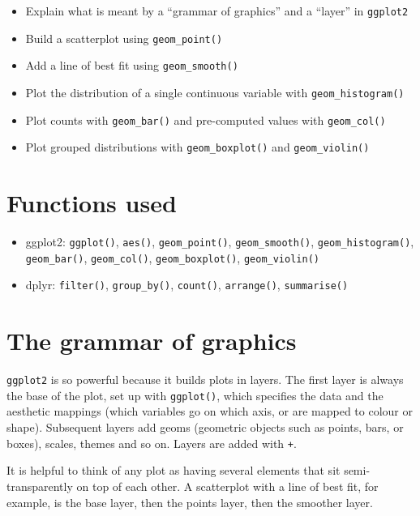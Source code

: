 \documentclass[
  english,
  letterpaper,
]{book}
\providecommand{\tightlist}{%
  \setlength{\itemsep}{0pt}\setlength{\parskip}{0pt}}
\begin{document}
\begin{itemize}
\tightlist
\item
  Explain what is meant by a ``grammar of graphics'' and a ``layer'' in
  \texttt{ggplot2}
\item
  Build a scatterplot using \texttt{geom\_point()}
\item
  Add a line of best fit using \texttt{geom\_smooth()}
\item
  Plot the distribution of a single continuous variable with
  \texttt{geom\_histogram()}
\item
  Plot counts with \texttt{geom\_bar()} and pre-computed values with
  \texttt{geom\_col()}
\item
  Plot grouped distributions with \texttt{geom\_boxplot()} and
  \texttt{geom\_violin()}
\end{itemize}

\section{Functions used}\label{functions-used-1}

\begin{itemize}
\tightlist
\item
  ggplot2: \texttt{ggplot()}, \texttt{aes()}, \texttt{geom\_point()},
  \texttt{geom\_smooth()}, \texttt{geom\_histogram()},
  \texttt{geom\_bar()}, \texttt{geom\_col()}, \texttt{geom\_boxplot()},
  \texttt{geom\_violin()}
\item
  dplyr: \texttt{filter()}, \texttt{group\_by()}, \texttt{count()},
  \texttt{arrange()}, \texttt{summarise()}
\end{itemize}

\section{The grammar of graphics}\label{the-grammar-of-graphics}

\texttt{ggplot2} is so powerful because it builds plots in layers. The
first layer is always the base of the plot, set up with
\texttt{ggplot()}, which specifies the data and the aesthetic mappings
(which variables go on which axis, or are mapped to colour or shape).
Subsequent layers add geoms (geometric objects such as points, bars, or
boxes), scales, themes and so on. Layers are added with \texttt{+}.

It is helpful to think of any plot as having several elements that sit
semi-transparently on top of each other. A scatterplot with a line of
best fit, for example, is the base layer, then the points layer, then
the smoother layer.
\end{document}
